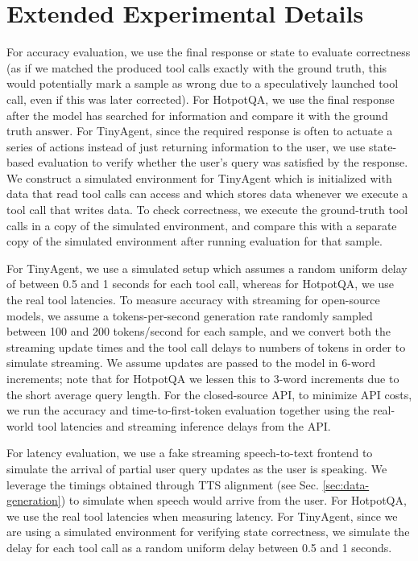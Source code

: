 \section{Extended Experimental Details}
\label{sec:appendix_experimental_details}
For accuracy evaluation, we use the final response or state to evaluate correctness (as if we matched the produced tool calls exactly with the ground truth, this would potentially mark a sample as wrong due to a speculatively launched tool call, even if this was later corrected). 
For HotpotQA, we use the final response after the model has searched for information and compare it with the ground truth answer.
For TinyAgent, since the required response is often to actuate a series of actions instead of just returning information to the user, we use state-based evaluation to verify whether the user's query was satisfied by the response.
We construct a simulated environment for TinyAgent which is initialized with data that read tool calls can access and which stores data whenever we execute a tool call that writes data.
To check correctness, we execute the ground-truth tool calls in a copy of the simulated environment, and compare this with a separate copy of the simulated environment after running evaluation for that sample.


For TinyAgent, we use a simulated setup which assumes a random uniform delay of between 0.5 and 1 seconds for each tool call, whereas for HotpotQA, we use the real tool latencies.
To measure accuracy with streaming for open-source models, we assume a tokens-per-second generation rate randomly sampled between 100 and 200 tokens/second for each sample, and we convert both the streaming update times and the tool call delays to numbers of tokens in order to simulate streaming.
We assume updates are passed to the model in 6-word increments; note that for HotpotQA we lessen this to 3-word increments due to the short average query length.
For the closed-source API, to minimize API costs, we run the accuracy and time-to-first-token evaluation together using the real-world tool latencies and streaming inference delays from the API.

For latency evaluation, we use a fake streaming speech-to-text frontend to simulate the arrival of partial user query updates as the user is speaking.
We leverage the timings obtained through TTS alignment (see Sec. \ref{sec:data-generation}) to simulate when speech would arrive from the user.
For HotpotQA, we use the real tool latencies when measuring latency.
For TinyAgent, since we are using a simulated environment for verifying state correctness, we simulate the delay for each tool call as a random uniform delay between 0.5 and 1 seconds.

